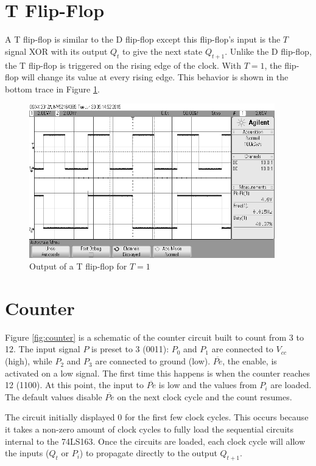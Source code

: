 \documentclass[11pt]{article}
\begin{document}
\section{T Flip-Flop}

A T flip-flop is similar to the D flip-flop except this flip-flop's input is the $T$ signal XOR with its output $Q_t$ to give the next state $Q_{t+1}$. Unlike the D flip-flop, the T flip-flop is triggered on the rising edge of the clock. With $T = 1$, the flip-flop will change its value at every rising edge. This behavior is shown in the bottom trace in Figure \ref{fig:t-ff}.

\begin{figure}[htpb]
	\centering
	\includegraphics[width=0.95\textwidth]{t-ff}
	\caption{Output of a T flip-flop for $T=1$}
	\label{fig:t-ff}
\end{figure}

\newpage
\section{Counter}
Figure \ref{fig:counter} is a schematic of the counter circuit built to count from 3 to 12. The input signal $P$ is preset to 3 (0011): $P_0$ and $P_1$ are connected to $V_{cc}$ (high), while $P_2$ and $P_3$ are connected to ground (low). $\overline{Pe}$, the enable, is activated on a low signal. The first time this happens is when the counter reaches 12 (1100). At this point, the input to $\overline{Pe}$ is low and the values from $P_i$ are loaded. The default values disable $\overline{Pe}$ on the next clock cycle and the count resumes.

The circuit initially displayed 0 for the first few clock cycles. This occurs because it takes a non-zero amount of clock cycles to fully load the sequential circuits internal to the 74LS163. Once the circuits are loaded, each clock cycle will allow the inputs ($Q_t$ or $P_i$) to propagate directly to the output $Q_{t+1}$.
\end{document}
